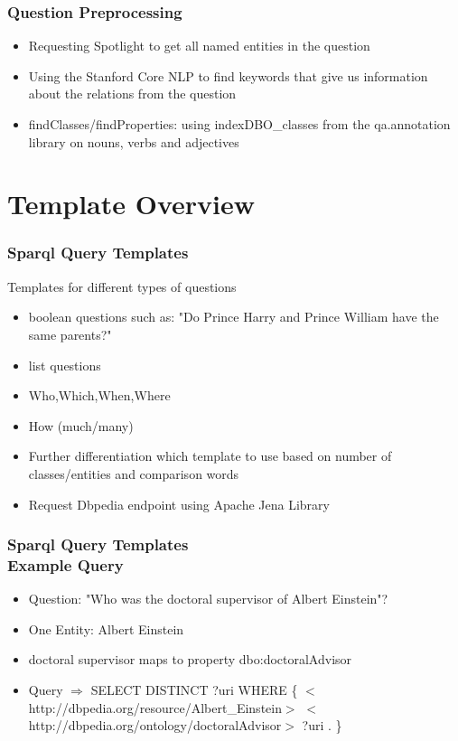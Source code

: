 \documentclass{beamer}
\newcommand\tab[1][1cm]{\hspace*{#1}}
\begin{document}
\begin{frame}
\frametitle{Question Preprocessing}
\begin{itemize}
	\item Requesting Spotlight to get all named entities in the question
	\item Using the Stanford Core NLP to find keywords that give us information about the relations from the question 
	\item findClasses/findProperties: using indexDBO\_classes from the qa.annotation library on nouns, verbs and adjectives
\end{itemize}
\end{frame}

\section{Template Overview}

\begin{frame}
\frametitle{Sparql Query Templates}
\begin{block}{Templates for different types of questions}
	\begin{itemize}
		\item boolean questions such as: "Do Prince Harry and Prince William have the same parents?"
		\item list questions
		\item Who,Which,When,Where 
		\item How (much/many)
	\end{itemize}
\end{block}
\begin{itemize}
	\item Further differentiation which template to use based on number of classes/entities and comparison words
	\item Request Dbpedia endpoint using Apache Jena Library 
\end{itemize}
\end{frame}



\begin{frame}
\frametitle{Sparql Query Templates \\ {\normalsize Example Query}}
\begin{example}
	\begin{itemize}
		\item Question: "Who was the doctoral supervisor of Albert Einstein"?
		\item One Entity: Albert Einstein
		\item doctoral supervisor maps to property dbo:doctoralAdvisor  
		\item[] Query $\Rightarrow$ SELECT DISTINCT ?uri WHERE \{  
		\tab[1.4cm] $<$http://dbpedia.org/resource/Albert\_Einstein$>$ 
		\tab[1.4cm] $<$http://dbpedia.org/ontology/doctoralAdvisor$>$ ?uri . \}
	\end{itemize}
\end{example}
\end{frame}
\end{document}
